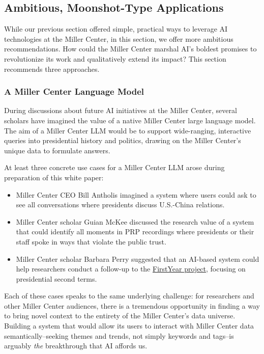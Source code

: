 \documentclass[12pt, oneside]{article}   	%
\begin{document}
\subsection{Ambitious, Moonshot-Type Applications}\label{section.applications.hard}
While our previous section offered simple, practical ways to leverage AI technologies at the Miller Center, in this section, we offer more ambitious recommendations.  How could the Miller Center marshal AI’s boldest promises to revolutionize its work and qualitatively extend its impact?  This section recommends three approaches.


\subsubsection{A Miller Center Language Model}\label{section.applications.hard.mcllm}
During discussions about future AI initiatives at the Miller Center, several scholars have imagined the value of a native Miller Center large language model.  The aim of a Miller Center LLM would be to support wide-ranging, interactive queries into presidential history and politics, drawing on the Miller Center's unique data to formulate answers.

At least three concrete use cases for a Miller Center LLM arose during preparation of this white paper:
\begin{itemize}
\item Miller Center CEO Bill Antholis imagined a system where users could ask to see all conversations where presidents discuss U.S.-China relations. 
\item Miller Center scholar Guian McKee discussed the research value of a system that could identify all moments in PRP recordings where presidents or their staff spoke in ways that violate the public trust.  
\item Miller Center scholar Barbara Perry suggested that an AI-based system could help researchers conduct a follow-up to the \href{firstyear2017.org}{FirstYear project}, focusing on presidential second terms.
\end{itemize}
Each of these cases speaks to the same underlying challenge: for researchers and other Miller Center audiences, there is a tremendous opportunity in finding a way to bring novel context to  the entirety of the Miller Center's data universe.  Building a system that would allow its users to interact with Miller Center data semantically--seeking themes and trends, not simply keywords and tags--is arguably \emph{the} breakthrough that AI affords us.
\end{document}

